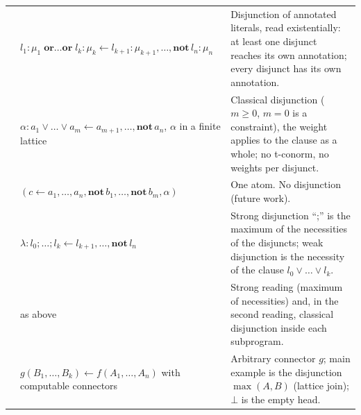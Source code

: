 {\begin{longtable}{@{}p{}p{}p{}@{}}
            \cite{Saad2010disjunctive}            & $l_1:\mu_1\;\mathbf{or}\dots\mathbf{or}\;l_k:\mu_k\leftarrow l_{k+1}:\mu_{k+1},\dots,\mathbf{not}\,l_n:\mu_n$                                           & Disjunction of annotated literals, read existentially: at least one disjunct reaches its own annotation; every disjunct has its own annotation.                                                                                     \\
            \cite{NievesOC07,NievesOC13}          & $\alpha:a_1\lor\dots\lor a_m\leftarrow a_{m+1},\dots,\mathbf{not}\,a_n$, $\alpha$ in a finite lattice                                                   & Classical disjunction ($m\geq0$, $m=0$ is a constraint), the weight applies to the clause as a whole; no t-conorm, no weights per disjunct.                                                                                         \\
            \cite{NicolasGSL06}                   & $(c\leftarrow a_1,\dots,a_n,\mathbf{not}\,b_1,\dots,\mathbf{not}\,b_m,\alpha)$                                                                          & One atom. No disjunction (future work).                                                                                                                                                                                             \\
            \cite{BautersSDV14tplp}               & $\lambda:l_0;\dots;l_k\leftarrow l_{k+1},\dots,\mathbf{not}\,l_n$                                                                                       & Strong disjunction ``;'' is the maximum of the necessities of the disjuncts; weak disjunction is the necessity of the clause $l_0\lor\dots\lor l_k$.                                                                                \\
            \cite{BautersSDV14ijar}               & as above                                                                                                                                                & Strong reading (maximum of necessities) and, in the second reading, classical disjunction inside each subprogram.                                                                                                                   \\
            \cite{StracciaOD09}                   & $g(B_1,\dots,B_k)\leftarrow f(A_1,\dots,A_n)$ with computable connectors                                                                                & Arbitrary connector $g$; main example is the disjunction $\max(A,B)$ (lattice join); $\bot$ is the empty head.                                                                                                                      \\

\end{longtable}}
